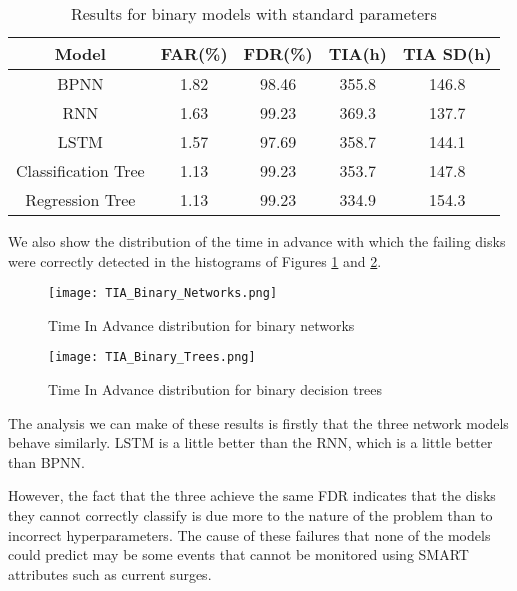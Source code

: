 \begin{table}
  \begin{center}
    \begin{tabular}{|c|c|c|c|c|}
      \hline
    Model & FAR(\%) & FDR(\%) & TIA(h) & TIA SD(h) \\
    \hline
    BPNN & 1.82 & 98.46 & 355.8 & 146.8 \\
    RNN & 1.63 & 99.23 & 369.3 & 137.7 \\
    LSTM & 1.57 & 97.69 & 358.7 & 144.1 \\
    Classification Tree & 1.13 & 99.23 & 353.7 & 147.8 \\
    Regression Tree & 1.13 & 99.23 & 334.9 & 154.3 \\
    \hline
    \end{tabular}
    \caption[Results Binary Models]{Results for binary models with standard parameters}
    \label{table:results_binary}
  \end{center}
\end{table}

We also show the distribution of the time in advance with which the failing disks were correctly detected in the histograms of Figures \ref{fig:tia_binary_network} and \ref{fig:tia_binary_tree}.

\begin{figure}
\begin{center}
  \texttt{[image: TIA\_Binary\_Networks.png]}
  \caption[TIA for binary networks]{Time In Advance distribution for binary networks}
  \label{fig:tia_binary_network}
\end{center}
\end{figure}

\begin{figure}
\begin{center}
  \texttt{[image: TIA\_Binary\_Trees.png]}
  \caption[TIA for binary decision trees]{Time In Advance distribution for binary decision trees}
  \label{fig:tia_binary_tree}
\end{center}
\end{figure}

The analysis we can make of these results is firstly that the three network models behave similarly.
LSTM is a little better than the RNN, which is a little better than BPNN.

However, the fact that the three achieve the same FDR indicates that the disks they cannot correctly classify is due more to the nature of the problem than to incorrect hyperparameters.
The cause of these failures that none of the models could predict may be some events that cannot be monitored using SMART attributes such as current surges.


